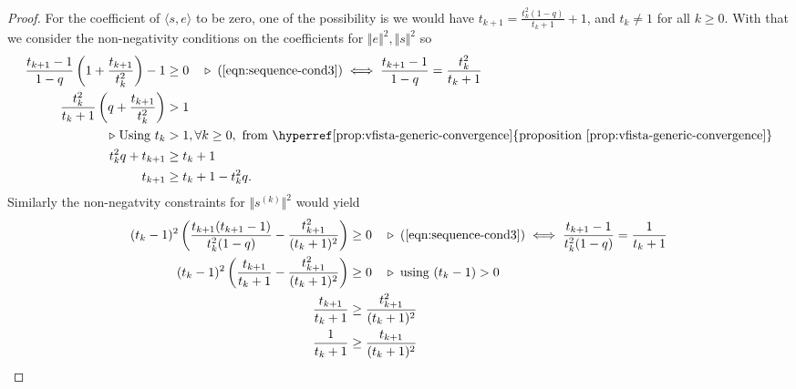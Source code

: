\begin{proof}
        \par
        For the coefficient of $\langle s, e\rangle$ to be zero, one of the possibility is we would have $t_{k + 1} = \frac{t_k^2(1 - q)}{t_k + 1} + 1$, and $t_k \neq 1$ for all $k\ge 0$. With that we consider the non-negativity conditions on the coefficients for $\Vert e\Vert^2, \Vert s\Vert^2$ so 
        \begin{align}
            \frac{t_{k + 1} - 1}{1 - q} 
            \left(
                1 + \frac{t_{k + 1}}{t_k^2}
            \right)
            -1
            &\ge 0 \quad \triangleright\;  (\ref*{eqn:sequence-cond3}) \iff 
            \frac{t_{k + 1}-1}{1 - q}
            = \frac{t_k^2}{t_k + 1}
            \nonumber
            \\
            \frac{t_k^2}{t_k + 1}\left(
                q + \frac{t_{k + 1}}{t_k^2} 
            \right) 
            &> 1
            \nonumber
            \\
            \triangleright \; \text{Using } t_k &> 1, \forall k\ge0, \text{ from \hyperref[prop:vfista-generic-convergence]{proposition \ref*{prop:vfista-generic-convergence}}}
            \nonumber
            \\
            t_k^2 q + t_{k + 1} &\ge t_k + 1
            \nonumber
            \\
            t_{k + 1} &\ge t_k + 1 - t_k^2 q. \label{eqn:seq-cond1}
        \end{align}
        Similarly the non-negatvity constraints for $\Vert s^{(k)}\Vert^2$ would yield 
        \begin{align*}
            (t_k - 1)^2 
            \left(
                \frac{t_{k + 1}(t_{k + 1} - 1)}{t_k^2(1 - q)}
                -
                \frac{t_{k + 1}^2}{(t_k + 1)^2}
            \right) & 
            \ge 0
            \quad \triangleright \; (\ref*{eqn:sequence-cond3}) 
            \iff \frac{t_{k + 1} - 1}{t_k^2(1 - q)}
            = 
            \frac{1}{t_k + 1}
            \\
            (t_k - 1)^2 \left(
                \frac{t_{k +1}}{t_k + 1} - 
                \frac{t_{k + 1}^2}{(t_k +1)^2} 
            \right)
            &\ge 0 \quad \triangleright \; \text{using } (t_k-1) > 0 
            \\
            \frac{t_{k + 1}}{t_k + 1} &\ge 
            \frac{t_{k + 1}^2}{(t_k + 1)^2}
            \\
            \frac{1}{t_k + 1} & \ge 
            \frac{t_{k + 1}}{(t_k + 1)^2}
            \\

\end{align*}
\end{proof}
